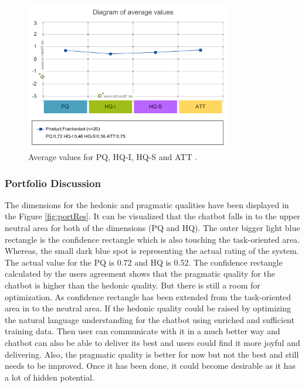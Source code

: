 \begin{figure}[!h]
    \centering
    \includegraphics[width=0.8\textwidth]{img/Diagram_of_average_values.png}
    \caption{Average values for PQ, HQ-I, HQ-S and ATT \cite{attrakdiff}.}
    \label{fig:avgValAttrak}
\end{figure}

\subsubsection*{Portfolio Discussion}
The dimensions for the hedonic and pragmatic qualities have been displayed in the Figure \ref{fig:portRes}. It can be visualized that the chatbot falls in to the upper neutral area for both of the dimensions (PQ and HQ). The outer bigger light blue rectangle is the confidence rectangle which is also touching the task-oriented area. Whereas, the small dark blue spot is representing the actual rating of the system. The actual value for the PQ is 0.72 and HQ is 0.52. The confidence rectangle calculated by the users agreement shows that the pragmatic quality for the chatbot is higher than the hedonic quality. But there is still a room for optimization. As confidence rectangle has been extended from the task-oriented area in to the neutral area. If the hedonic quality could be raised by optimizing the natural language understanding for the chatbot using enriched and sufficient training data. Then user can communicate with it in a much better way and chatbot can also be able to deliver its best and users could find it more joyful and delivering. Also, the pragmatic quality is better for now but not the best and still needs to be improved. Once it has been done, it could become desirable as it has a lot of hidden potential. 

